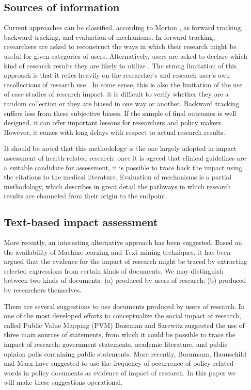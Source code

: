 \documentclass[]{book}
\theoremstyle{definition}
\theoremstyle{definition}
\theoremstyle{definition}
\theoremstyle{remark}
\begin{document}
\subsection{Sources of information}\label{sources-of-information}

Current approaches can be classified, according to Morton
\citep{morton2015progressing}, as forward tracking, backward tracking,
and evaluation of mechanisms. In forward tracking, researchers are asked
to reconstruct the ways in which their research might be useful for
given categories of users. Alternatively, users are asked to declare
which kind of research results they are likely to utilize
\citep{tang2000pilot}. The strong limitation of this approach is that it
relies heavily on the researcher's and research user's own recollections
of research use \citep{nutley2007using, donovan2011state}. In some
sense, this is also the limitation of the use of case studies of
research impact: it is difficult to verify whether they are a random
collection or they are biased in one way or another. Backward tracking
suffers less from these subjective biases. If the sample of final
outcomes is well designed, it can offer important lessons for
researchers and policy makers. However, it comes with long delays with
respect to actual research results.

It should be noted that this methodology is the one largely adopted in
impact assessment of health-related research: once it is agreed that
clinical guidelines are a suitable candidate for assessment, it is
possible to trace back the impact using the citations to the medical
literature. Evaluation of mechanisms is a partial methodology, which
describes in great detail the pathways in which research results are
channeled from their origin to the endpoint.

\subsection{Text-based impact
assessment}\label{text-based-impact-assessment}

More recently, an interesting alternative approach has been suggested.
Based on the availability of Machine learning and Text mining
techniques, it has been argued that the evidence for the impact of
research might be traced by extracting selected expressions from certain
kinds of documents. We may distinguish between two kinds of documents:
(a) produced by users of research; (b) produced by researchers
themselves.

There are several suggestions to use documents produced by users of
research. In one of the most developed efforts to conceptualize the
social impact of research, called Public Value Mapping (PVM) Bozeman and
Sarewitz \citep{bozeman2011public} suggested the use of three main
sources of statements, from which it could be possible to trace the
impact of research: government statements, academic literature, and
public opinion polls containing public statements. More recently,
Bornmann, Haunschild and Marx \citep{bornmann2016policy} have suggested
to use the frequency of occurrence of policy-related words in policy
documents as evidence of impact of research. In this paper we will make
these suggestions operational.
\end{document}

